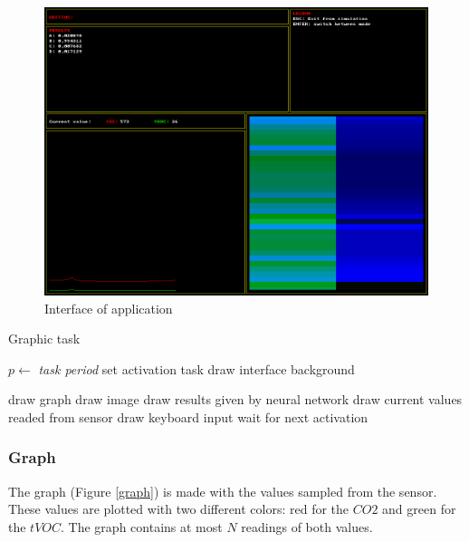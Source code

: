 \documentclass[12pt]{article}
\begin{document}
\begin{figure}[H]
    \centering
    \includegraphics[width=\textwidth]{images/interface.png}
    \caption{Interface of application}
    \label{interface}
\end{figure}

\begin{algorithm}[H]
\caption{Graphic task}
\label{graphic}

\begin{algorithmic}
\State $p\gets$ \textit{task period}
\State set activation task
\State draw interface background

\Loop
\State draw graph
\State draw image
\State draw results given by neural network
\State draw current values readed from sensor
\State draw keyboard input
\State wait for next activation
\EndLoop

\end{algorithmic}
\end{algorithm}

\subsubsection*{Graph}
The graph (Figure \ref{graph}) is made with the values sampled from the 
sensor. These values are plotted with two different colors: red for the $CO2$
and green for the $tVOC$. The graph contains at most $N$ readings of both values.
\end{document}

